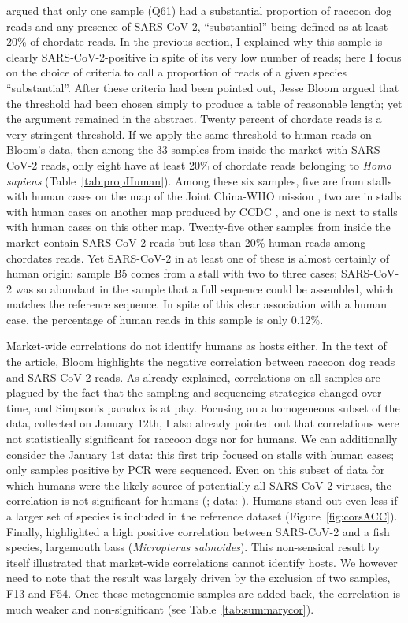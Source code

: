 \documentclass[11pt]{article}
\def \sct {\mbox{SARS-CoV-2}}
\begin{document}
 argued that only one sample (Q61) had a substantial proportion of raccoon dog reads and any presence of \sct{}, ``substantial'' being defined as at least 20\% of chordate reads. In the previous section, I explained why this sample is clearly \sct{}-positive in spite of its very low number of reads; here I focus on the choice of criteria to call a proportion of reads of a given species ``substantial''. After these criteria had been pointed out, Jesse Bloom argued that the threshold had been chosen simply to produce a table of reasonable length; yet the argument remained in the abstract. Twenty percent of chordate reads is a very stringent threshold. If we apply the same threshold to human reads on Bloom's data, then among the 33 samples from inside the market with \sct{} reads, only eight have at least 20\% of chordate reads belonging to \textit{Homo sapiens} (Table~\ref{tab:propHuman}). Among these six samples, five are from stalls with human cases on the map of the Joint China-WHO mission \citep{WHO2021}, two are in stalls with human cases on another map produced by CCDC \citep{Koopmans2021BMJ}, and one is next to stalls with human cases on this other map. Twenty-five other samples from inside the market contain \sct{} reads but less than 20\% human reads among chordates reads. Yet \sct{} in at least one of these is almost certainly of human origin: sample B5 comes from a stall with two to three cases; \sct{} was so abundant in the sample that a full sequence could be assembled, which matches the reference sequence. In spite of this clear association with a human case, the percentage of human reads in this sample is only 0.12\%.
 
Market-wide correlations do not identify humans as hosts either. In the text of the article, Bloom highlights the negative correlation between raccoon dog reads and \sct{} reads. As already explained, correlations on all samples are plagued by the fact that the sampling and sequencing strategies changed over time, and Simpson's paradox is at play. Focusing on a homogeneous subset of the data, collected on January 12th, I also already pointed out that correlations were not statistically significant for raccoon dogs nor for humans. We can additionally consider the January 1st data: this first trip focused on stalls with human cases; only samples positive by PCR were sequenced. Even on this subset of data for which humans were the likely source of potentially all \sct{} viruses, the correlation is not significant for humans (\JBFirstSCHS{}; data: \citet{Bloom2023VE}). Humans stand out even less if a larger set of species is included in the reference dataset (Figure~\ref{fig:corsACC}). Finally, \citet{Bloom2023VE} highlighted a high positive correlation between \sct{} and a fish species, largemouth bass (\textit{Micropterus salmoides}). This non-sensical result by itself illustrated that market-wide correlations cannot identify hosts. We however need to note that the result was largely driven by the exclusion of two samples, F13 and F54. Once these metagenomic samples are added back, the correlation is much weaker and non-significant (see Table~\ref{tab:summarycor}). 
\end{document}
